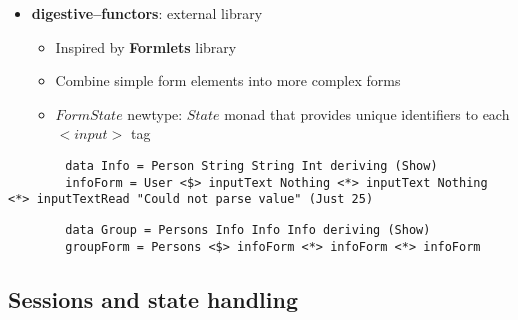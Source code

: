 \documentclass[10pt,usenames,dvipsnames]{beamer}
\begin{document}
	\begin{frame}[fragile]
		\begin{itemize}
		\item \textbf{digestive--functors}: external library
		\begin{itemize}
			\item Inspired by \textbf{Formlets} library
			\item Combine simple form elements into more complex forms
			\item $ FormState $ newtype: $ State $ monad that provides unique identifiers to each $ <input> $ tag
		\end{itemize}
		\end{itemize}


		\begin{lstlisting}
		data Info = Person String String Int deriving (Show)
		infoForm = User <$> inputText Nothing <*> inputText Nothing <*> inputTextRead "Could not parse value" (Just 25)
		\end{lstlisting}

		\begin{lstlisting}
		data Group = Persons Info Info Info deriving (Show)
		groupForm = Persons <$> infoForm <*> infoForm <*> infoForm
		\end{lstlisting}

	\end{frame}
	
	\subsection*{Sessions and state handling}
	
\end{document}
